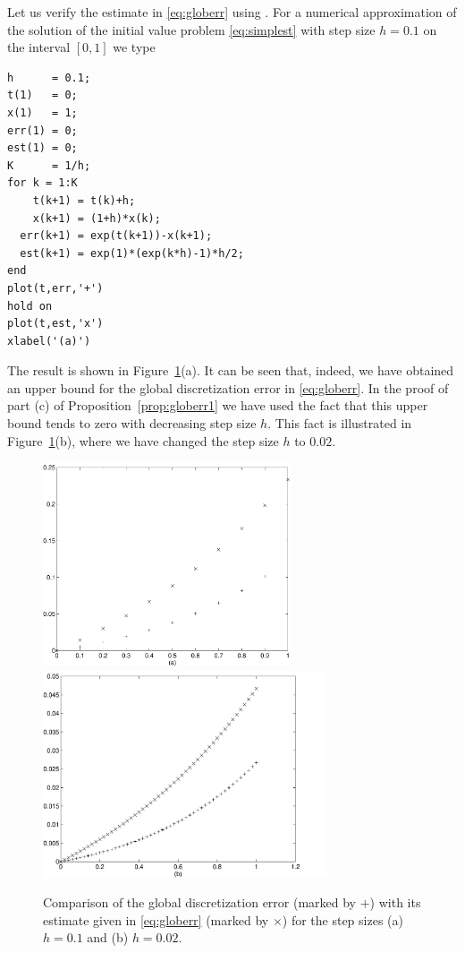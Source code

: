 \documentclass{ximera}
\begin{document}
Let us verify the estimate in \eqref{eq:globerr} using \Matlabp.  For a
numerical approximation of the solution of the initial value problem 
\eqref{eq:simplest} with step size $h=0.1$ on the interval $[0,1]$
we type
\begin{verbatim}
h      = 0.1;
t(1)   = 0;
x(1)   = 1;
err(1) = 0;
est(1) = 0;
K      = 1/h;
for k = 1:K
    t(k+1) = t(k)+h;
    x(k+1) = (1+h)*x(k);
  err(k+1) = exp(t(k+1))-x(k+1);
  est(k+1) = exp(1)*(exp(k*h)-1)*h/2;
end
plot(t,err,'+')
hold on
plot(t,est,'x')
xlabel('(a)')
\end{verbatim}
The result is shown in Figure~\ref{fig:globerr1}(a).
It can be seen that, indeed, we have
obtained an upper bound for the global discretization error in
\eqref{eq:globerr}.  In the proof of part (c) of Proposition~\ref{prop:globerr1}
we have used the fact that this upper bound tends to zero with decreasing 
step size $h$.  This fact is illustrated in Figure~\ref{fig:globerr1}(b),
where we have changed the step size $h$ to $0.02$.
\begin{figure}[htb]
   \centerline{%
   \includegraphics[width=2.9in]{../figures/globerr1.pdf}
   \includegraphics[width=3.3in]{../figures/globerr2.pdf}}
   \caption{Comparison of the global discretization error (marked by
   $+$) with its estimate given in \protect\eqref{eq:globerr} 
   (marked by $\times$) for the step sizes (a) $h=0.1$ and 
   (b) $h=0.02$.}
   \label{fig:globerr1}
\end{figure}
\end{document}
